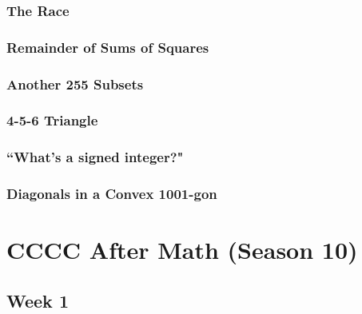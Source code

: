 \documentclass[titlepage=true]{scrartcl}
\begin{document}
        \subsubsection{The Race}
            \label{8-2-2}  
            
        \newpage

        \subsubsection{Remainder of Sums of Squares}
            \label{8-2-3}  
            
        \newpage

        \subsubsection{Another 255 Subsets}
            \label{8-2-4}
            
        \newpage 

        \subsubsection{4-5-6 Triangle}
            \label{8-2-5}  
            
        \newpage

        \subsubsection{``What's a signed integer?"}
            \label{8-2-6}
            
        \newpage

        \subsubsection{Diagonals in a Convex 1001-gon}
            \label{8-2-7}  
            
        \newpage

\setcounter{section}{9}
\section{CCCC After Math (Season 10)}

    \subsection{Week 1}
\end{document}
